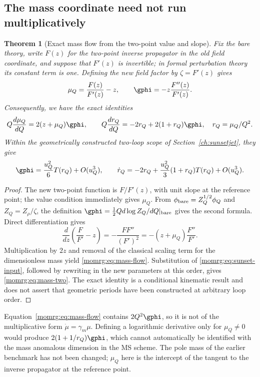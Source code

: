 \documentclass[11pt,a4paper,oneside]{article}
\theoremstyle{plain}
\newtheorem{theorem}{Theorem}[section]
\theoremstyle{definition}
\theoremstyle{remark}
\numberwithin{equation}{section}
\begin{document}
\subsection{The mass coordinate need not run multiplicatively}\label{momrg:sec:mass}
\begin{theorem}[Exact mass flow from the two-point value and slope]\label{momrg:thm:mass}
Fix the bare theory, write $F(z)$ for the two-point inverse propagator in the old field coordinate,
and suppose that $F'(z)$ is invertible; in formal perturbation theory its constant term is one.
Defining the new field factor by $\zeta=F'(z)$ gives
\begin{equation}\label{momrg:eq:mass-coordinate}
 \mu_Q=\frac{F(z)}{F'(z)}-z,\qquad
 \gphi=-z\frac{F''(z)}{F'(z)}.
\end{equation}
Consequently, we have the exact identities
\begin{equation}\label{momrg:eq:mass-flow}
 Q\frac{d\mu_Q}{dQ}=2(z+\mu_Q)\gphi,\qquad
 Q\frac{dr_Q}{dQ}=-2r_Q+2(1+r_Q)\gphi,
 \quad r_Q=\mu_Q/Q^2.
\end{equation}
Within the geometrically constructed two-loop scope of Section~\ref{ch:sunsetjet}, they give
\begin{equation}\label{momrg:eq:mass-two}
 \gphi=\frac{u_Q^2}{6}T(r_Q)+O(u_Q^3),\qquad
 \dot r_Q=-2r_Q+\frac{u_Q^2}{3}(1+r_Q)T(r_Q)+O(u_Q^3).
\end{equation}
\end{theorem}
\begin{proof}
The new two-point function is $F/F'(z)$, with unit slope at the reference point;
the value condition immediately gives $\mu_Q$.
From $\phi_{\rm bare}=Z_Q^{1/2}\phi_Q$ and
$Z_Q=Z_\rho/\zeta$, the definition
$\gphi=\frac12Qd\log Z_Q/dQ|_{\rm bare}$ gives the second formula.
Direct differentiation gives
\[
 \frac{d}{dz}\left(\frac F{F'}-z\right)
 =-\frac{FF''}{(F')^2}
 =-(z+\mu_Q)\frac{F''}{F'}.
\]
Multiplication by $2z$ and removal of the classical scaling term for the dimensionless mass yield
\eqref{momrg:eq:mass-flow}.
Substitution of \eqref{momrg:eq:sunset-input}, followed by rewriting in the new parameters at this order,
gives \eqref{momrg:eq:mass-two}.
The exact identity is a conditional kinematic result and does not assert that geometric periods have been constructed at arbitrary loop order.
\end{proof}

Equation~\eqref{momrg:eq:mass-flow} contains $2Q^2\gphi$, so it is not of the
multiplicative form $\dot\mu=\gamma_m\mu$.
Defining a logarithmic derivative only for $\mu_Q\ne0$ would produce
$2(1+1/r_Q)\gphi$, which cannot automatically be identified with the mass anomalous dimension in the MS scheme.
The pole mass of the earlier benchmark has not been changed; $\mu_Q$ here is the intercept of the tangent to the inverse propagator at the reference point.
\end{document}
